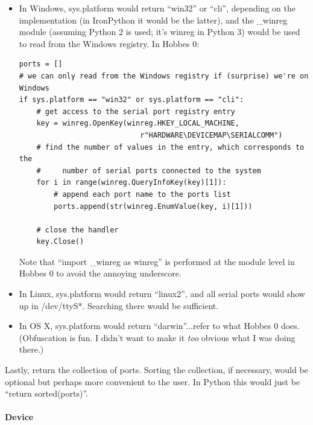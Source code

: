 \documentclass[12pt,letterpaper]{article}
\begin{document}
\begin{itemize}

\item In Windows, sys.platform would return ``win32'' or ``cli'', depending on the implementation (in IronPython it would be the latter), and the \_winreg module (assuming Python 2 is used; it's winreg in Python 3) would be used to read from the Windows registry. In Hobbes 0:

\selectfont

\begin{lstlisting}
ports = []
# we can only read from the Windows registry if (surprise) we're on Windows
if sys.platform == "win32" or sys.platform == "cli":
    # get access to the serial port registry entry
    key = winreg.OpenKey(winreg.HKEY_LOCAL_MACHINE,
                            r"HARDWARE\DEVICEMAP\SERIALCOMM")
    # find the number of values in the entry, which corresponds to the
    #     number of serial ports connected to the system
    for i in range(winreg.QueryInfoKey(key)[1]):
        # append each port name to the ports list
        ports.append(str(winreg.EnumValue(key, i)[1]))
        
    # close the handler
    key.Close()
\end{lstlisting}

\selectfont

Note that ``import \_winreg as winreg'' is performed at the module level in Hobbes 0 to avoid the annoying underscore.

\item In Linux, sys.platform would return ``linux2'', and all serial ports would show up in /dev/ttyS*. Searching there would be sufficient.

\item In OS X, sys.platform would return ``darwin''...refer to what Hobbes 0 does. (Obfuscation is fun. I didn't want to make it \emph{too} obvious what I was doing there.)

\end{itemize}

Lastly, return the collection of ports. Sorting the collection, if necessary, would be optional but perhaps more convenient to the user. In Python this would just be ``return sorted(ports)''.



%
%
\paragraph{Device}
\label{4.3.1.2}
\end{document}
